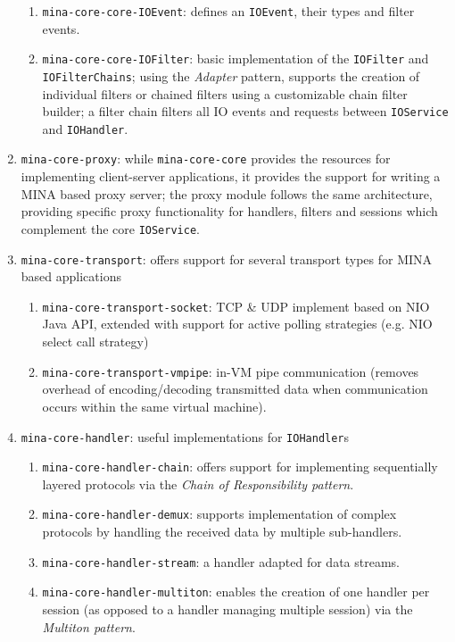 \begin{enumerate}
\begin{enumerate}
            \item \texttt{mina-core-core-IOEvent}: defines an \texttt{IOEvent}, their types and filter events.
            \item \texttt{mina-core-core-IOFilter}: basic implementation of the \texttt{IOFilter} and \texttt{IOFilterChains}; using the \textit{Adapter} pattern, supports the creation of individual filters or chained filters using a customizable chain filter builder; a filter chain filters all IO events and requests between \texttt{IOService} and \texttt{IOHandler}.
        \end{enumerate}
    \item \texttt{mina-core-proxy}: while \texttt{mina-core-core} provides the resources for implementing client-server applications, it provides the support for writing a MINA based proxy server; the proxy module follows the same architecture, providing specific proxy functionality for handlers, filters and sessions which complement the core \texttt{IOService}.
    \item \texttt{mina-core-transport}: offers support for several transport types for MINA based applications
        \begin{enumerate}
            \item \texttt{mina-core-transport-socket}: TCP \& UDP implement based on NIO Java API, extended with support for active polling strategies (e.g. NIO select call strategy)
            \item \texttt{mina-core-transport-vmpipe}: in-VM pipe communication (removes overhead of encoding/decoding transmitted data when communication occurs within the same virtual machine).
        \end{enumerate} 
    \item \texttt{mina-core-handler}: useful implementations for \texttt{IOHandler}s
        \begin{enumerate}
            \item \texttt{mina-core-handler-chain}: offers support for implementing sequentially layered protocols via the \textit{Chain of Responsibility pattern}.
            \item \texttt{mina-core-handler-demux}: supports implementation of complex protocols by handling the received data by multiple sub-handlers.
            \item \texttt{mina-core-handler-stream}: a handler adapted for data streams.
            \item \texttt{mina-core-handler-multiton}: enables the creation of one handler per session (as opposed to a handler managing multiple session) via the \textit{Multiton pattern}.

\end{enumerate}
\end{enumerate}
